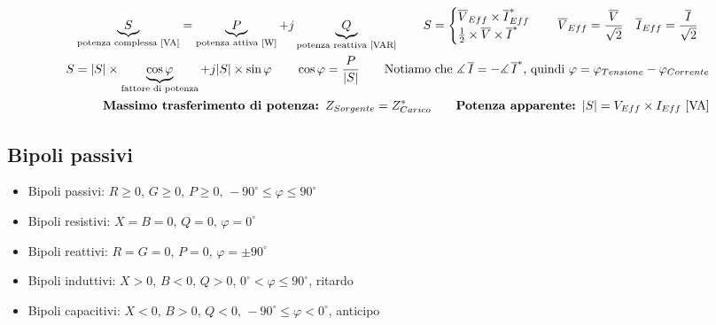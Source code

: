 \documentclass[10pt]{article}
\renewcommand{\deg}{^{\circ}}
\begin{document}
        \begin{gather*}
            \underbrace{S}_{\text{potenza complessa [VA]}} = \underbrace{P}_{\text{potenza attiva [W]}} + j \underbrace{Q}_{\text{potenza reattiva [VAR]}} \qquad
                S =
                    \begin{cases}
                        \overline{V}_{Eff} \times \overline{I}^*_{Eff}\\
                        \frac{1}{2} \times \overline{V} \times \overline{I}^*
                    \end{cases}
                \quad \overline{V}_{Eff} = \frac{\overline{V}}{\sqrt{2}} \quad \overline{I}_{Eff} = \frac{\overline{I}}{\sqrt{2}}\\
                S = \abs{S} \times \underbrace{\cos \varphi}_{\text{fattore di potenza}} + j \abs{S} \times \sin \varphi \qquad \cos \varphi = \frac{P}{\abs{S}} \qquad \text{Notiamo che } \measuredangle \, \overline{I} = - \measuredangle \, \overline{I}^* \text{, quindi } \varphi = \varphi_{Tensione} - \varphi_{Corrente}\\
                \qquad\quad\textbf{Massimo trasferimento di potenza: } Z_{Sorgente} = Z^*_{Carico} \qquad \textbf{Potenza apparente: } \abs{S} = V_{Eff} \times I_{Eff} \text{ [VA]}
            \end{gather*}

    \vspace{-2\baselineskip}
    \subsection*{Bipoli passivi}
    \vspace{-.5\baselineskip}

        \begin{minipage}[t]{.45\textwidth}
            \begin{itemize}
                \item Bipoli passivi: \(R \geqslant 0,\, G \geqslant 0,\, P \geqslant 0,\, -90\deg \leqslant \varphi \leqslant 90\deg\)
                \item Bipoli resistivi: \(X=B=0,\, Q=0,\, \varphi=0\deg\)
                \item Bipoli reattivi: \(R=G=0,\, P=0,\, \varphi=\pm90\deg\)
            \end{itemize}
        \end{minipage}
        \hfill
        \begin{minipage}[t]{.55\textwidth}
            \begin{itemize}
                \item Bipoli induttivi: \(X > 0,\, B<0,\, Q>0,\, 0\deg < \varphi \leqslant 90\deg\), ritardo
                \item Bipoli capacitivi: \(X<0,\, B>0,\, Q<0,\, -90\deg \leqslant \varphi < 0\deg\), anticipo
            \end{itemize}
        \end{minipage}
\end{document}
